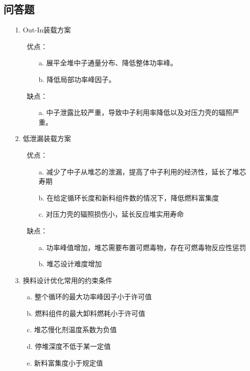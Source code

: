 \documentclass[openany]{ctexart}
\numberwithin{equation}{section} %
\begin{document}
\subsection{问答题}
\begin{itemize}
	\item [1.]  {\heiti Out-In装载方案}
	\vspace{-0.08cm}
	\begin{itemize}
		\item [优点：]
		\begin{itemize}
			\item [a.]展平全堆中子通量分布、降低整体功率峰。
			\item [b.]降低局部功率峰因子。
		\end{itemize}
		\item [缺点：]
		\begin{itemize}
			\item [a.]中子泄露比较严重，导致中子利用率降低以及对压力壳的辐照严重。
		\end{itemize}
	\end{itemize}
	
	\vspace{0.06cm}
	
	\item [2.]{\heiti 低泄漏装载方案}
	\vspace{-0.08cm}
	\begin{itemize}
		\item [优点：]
		\begin{itemize}
			\item [a.]减少了中子从堆芯的泄漏，提高了中子利用的经济性，延长了堆芯寿期
			\item [b.]在给定循环长度和新料组件数的情况下，降低燃料富集度
			\item [c.]对压力壳的辐照损伤小，延长反应堆实用寿命
		\end{itemize}
		
		\item [缺点：]
		\begin{itemize}
			\item [a.]功率峰值增加，堆芯需要布置可燃毒物，存在可燃毒物反应性惩罚
			\item [b.]堆芯设计难度增加
		\end{itemize}
	\end{itemize}
	
	\vspace{0.06cm}
	
	\item [3.]{\heiti 换料设计优化常用的约束条件}
	\vspace{-0.06cm}
	\begin{itemize}
		\item [a.]整个循环的最大功率峰因子小于许可值
		\item [b.]燃料组件的最大卸料燃耗小于许可值
		\item [c.]堆芯慢化剂温度系数为负值
		\item [d.]停堆深度不低于某一定值
		\item [e.]新料富集度小于规定值
	\end{itemize}
	

\end{itemize}
\end{document}
